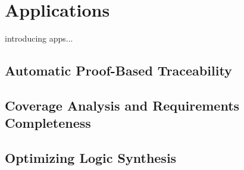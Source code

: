 \section{Applications}
\label{sec:apps}
introducing apps...

\subsection{Automatic Proof-Based Traceability}



\subsection{Coverage Analysis and Requirements Completeness}




\subsection{Optimizing Logic Synthesis}

